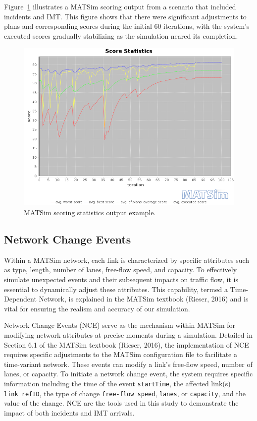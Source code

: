 \documentclass[fancy, oneside, mastersfancy, ms]{byuthesis}
\begin{document}
Figure~\ref{fig-score_output} illustrates a MATSim scoring output from a
scenario that included incidents and IMT. This figure shows that there
were significant adjustments to plans and corresponding scores during
the initial 60 iterations, with the system's executed scores gradually
stabilizing as the simulation neared its completion.

\begin{figure}

{\centering \includegraphics{figures/scorestats.png}

}

\caption{\label{fig-score_output}MATSim scoring statistics output
example.}

\end{figure}

\hypertarget{sec-NCE}{%
\subsection{Network Change Events}\label{sec-NCE}}

Within a MATSim network, each link is characterized by specific
attributes such as type, length, number of lanes, free-flow speed, and
capacity. To effectively simulate unexpected events and their subsequent
impacts on traffic flow, it is essential to dynamically adjust these
attributes. This capability, termed a Time-Dependent Network, is
explained in the MATSim textbook (Rieser, 2016) and is vital for
ensuring the realism and accuracy of our simulation.

Network Change Events (NCE) serve as the mechanism within MATSim for
modifying network attributes at precise moments during a simulation.
Detailed in Section 6.1 of the MATSim textbook (Rieser, 2016), the
implementation of NCE requires specific adjustments to the MATSim
configuration file to facilitate a time-variant network. These events
can modify a link's free-flow speed, number of lanes, or capacity. To
initiate a network change event, the system requires specific
information including the time of the event \texttt{startTime}, the
affected link(s) \texttt{link\ refID}, the type of change
\texttt{free-flow\ speed}, \texttt{lanes}, or \texttt{capacity}, and the
value of the change. NCE are the tools used in this study to demonstrate
the impact of both incidents and IMT arrivals.
\end{document}
